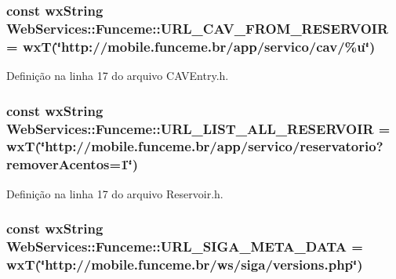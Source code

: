\subsubsection[{U\+R\+L\+\_\+\+C\+A\+V\+\_\+\+F\+R\+O\+M\+\_\+\+R\+E\+S\+E\+R\+V\+O\+IR}]{\setlength{\rightskip}{0pt plus 5cm}const wx\+String Web\+Services\+::\+Funceme\+::\+U\+R\+L\+\_\+\+C\+A\+V\+\_\+\+F\+R\+O\+M\+\_\+\+R\+E\+S\+E\+R\+V\+O\+IR = wxT(\char`\"{}http\+://mobile.\+funceme.\+br/app/servico/cav/\%u\char`\"{})}\label{namespace_web_services_1_1_funceme_aee2d6f4924e86b8a13886f0a7bd8e6b2}


Definição na linha 17 do arquivo C\+A\+V\+Entry.\+h.

\subsubsection[{U\+R\+L\+\_\+\+L\+I\+S\+T\+\_\+\+A\+L\+L\+\_\+\+R\+E\+S\+E\+R\+V\+O\+IR}]{\setlength{\rightskip}{0pt plus 5cm}const wx\+String Web\+Services\+::\+Funceme\+::\+U\+R\+L\+\_\+\+L\+I\+S\+T\+\_\+\+A\+L\+L\+\_\+\+R\+E\+S\+E\+R\+V\+O\+IR = wxT(\char`\"{}http\+://mobile.\+funceme.\+br/app/servico/reservatorio?remover\+Acentos=1\char`\"{})}\label{namespace_web_services_1_1_funceme_ae7d903f0a82a66a169566f6b5e3fa8d1}


Definição na linha 17 do arquivo Reservoir.\+h.

\subsubsection[{U\+R\+L\+\_\+\+S\+I\+G\+A\+\_\+\+M\+E\+T\+A\+\_\+\+D\+A\+TA}]{\setlength{\rightskip}{0pt plus 5cm}const wx\+String Web\+Services\+::\+Funceme\+::\+U\+R\+L\+\_\+\+S\+I\+G\+A\+\_\+\+M\+E\+T\+A\+\_\+\+D\+A\+TA = wxT(\char`\"{}http\+://mobile.\+funceme.\+br/ws/siga/versions.\+php\char`\"{})}\label{namespace_web_services_1_1_funceme_a9a91fcfe40b7caa3ff201681676226f5}


